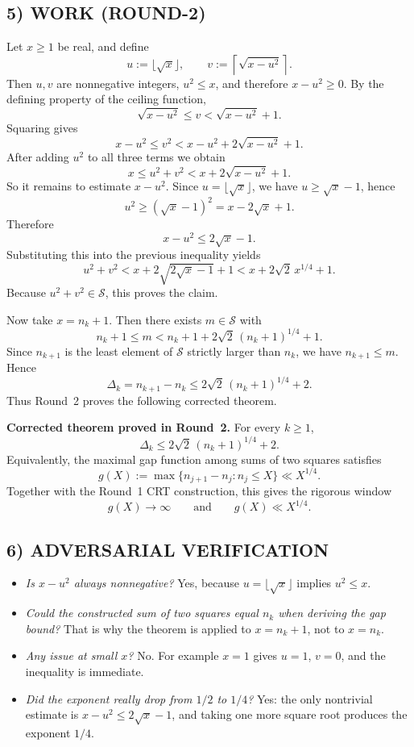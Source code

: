 \subsection*{5) WORK (ROUND-2)}
Let $x\ge 1$ be real, and define
\[
u:=\lfloor\sqrt{x}\rfloor,
\qquad
v:=\left\lceil\sqrt{x-u^2}\right\rceil.
\]
Then $u,v$ are nonnegative integers, $u^2\le x$, and therefore $x-u^2\ge 0$.
By the defining property of the ceiling function,
\[
\sqrt{x-u^2}\le v < \sqrt{x-u^2}+1.
\]
Squaring gives
\[
x-u^2\le v^2 < x-u^2 + 2\sqrt{x-u^2}+1.
\]
After adding $u^2$ to all three terms we obtain
\[
x\le u^2+v^2 < x + 2\sqrt{x-u^2}+1.
\]
So it remains to estimate $x-u^2$.
Since $u=\lfloor\sqrt{x}\rfloor$, we have $u\ge \sqrt{x}-1$, hence
\[
u^2 \ge (\sqrt{x}-1)^2 = x-2\sqrt{x}+1.
\]
Therefore
\[
x-u^2 \le 2\sqrt{x}-1.
\]
Substituting this into the previous inequality yields
\[
u^2+v^2 < x+2\sqrt{2\sqrt{x}-1}+1 < x+2\sqrt{2}\,x^{1/4}+1.
\]
Because $u^2+v^2\in\mathcal S$, this proves the claim.

Now take $x=n_k+1$.  Then there exists $m\in\mathcal S$ with
\[
n_k+1\le m < n_k+1+2\sqrt{2}\,(n_k+1)^{1/4}+1.
\]
Since $n_{k+1}$ is the least element of $\mathcal S$ strictly larger than $n_k$, we have $n_{k+1}\le m$.  Hence
\[
\Delta_k=n_{k+1}-n_k\le 2\sqrt{2}\,(n_k+1)^{1/4}+2.
\]
Thus Round~2 proves the following corrected theorem.

\medskip
\noindent\textbf{Corrected theorem proved in Round~2.}
For every $k\ge 1$,
\[
\Delta_k \le 2\sqrt{2}\,(n_k+1)^{1/4}+2.
\]
Equivalently, the maximal gap function among sums of two squares satisfies
\[
g(X):=\max\{n_{j+1}-n_j:n_j\le X\}\ll X^{1/4}.
\]
Together with the Round~1 CRT construction, this gives the rigorous window
\[
g(X)\to\infty
\qquad\mbox{and}\qquad
g(X)\ll X^{1/4}.
\]

\subsection*{6) ADVERSARIAL VERIFICATION}
\begin{itemize}
\item \emph{Is $x-u^2$ always nonnegative?} Yes, because $u=\lfloor\sqrt{x}\rfloor$ implies $u^2\le x$.
\item \emph{Could the constructed sum of two squares equal $n_k$ when deriving the gap bound?} That is why the theorem is applied to $x=n_k+1$, not to $x=n_k$.
\item \emph{Any issue at small $x$?} No.  For example $x=1$ gives $u=1$, $v=0$, and the inequality is immediate.
\item \emph{Did the exponent really drop from $1/2$ to $1/4$?} Yes: the only nontrivial estimate is $x-u^2\le 2\sqrt{x}-1$, and taking one more square root produces the exponent $1/4$.
\end{itemize}

